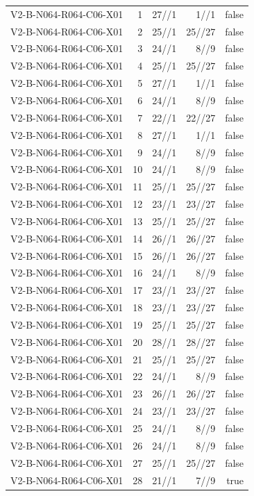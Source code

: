 {\begin{longtable}{lrrrr}
V2-B-N064-R064-C06-X01 & 1 & 27//1 & 1//1 & false \\
V2-B-N064-R064-C06-X01 & 2 & 25//1 & 25//27 & false \\
V2-B-N064-R064-C06-X01 & 3 & 24//1 & 8//9 & false \\
V2-B-N064-R064-C06-X01 & 4 & 25//1 & 25//27 & false \\
V2-B-N064-R064-C06-X01 & 5 & 27//1 & 1//1 & false \\
V2-B-N064-R064-C06-X01 & 6 & 24//1 & 8//9 & false \\
V2-B-N064-R064-C06-X01 & 7 & 22//1 & 22//27 & false \\
V2-B-N064-R064-C06-X01 & 8 & 27//1 & 1//1 & false \\
V2-B-N064-R064-C06-X01 & 9 & 24//1 & 8//9 & false \\
V2-B-N064-R064-C06-X01 & 10 & 24//1 & 8//9 & false \\
V2-B-N064-R064-C06-X01 & 11 & 25//1 & 25//27 & false \\
V2-B-N064-R064-C06-X01 & 12 & 23//1 & 23//27 & false \\
V2-B-N064-R064-C06-X01 & 13 & 25//1 & 25//27 & false \\
V2-B-N064-R064-C06-X01 & 14 & 26//1 & 26//27 & false \\
V2-B-N064-R064-C06-X01 & 15 & 26//1 & 26//27 & false \\
V2-B-N064-R064-C06-X01 & 16 & 24//1 & 8//9 & false \\
V2-B-N064-R064-C06-X01 & 17 & 23//1 & 23//27 & false \\
V2-B-N064-R064-C06-X01 & 18 & 23//1 & 23//27 & false \\
V2-B-N064-R064-C06-X01 & 19 & 25//1 & 25//27 & false \\
V2-B-N064-R064-C06-X01 & 20 & 28//1 & 28//27 & false \\
V2-B-N064-R064-C06-X01 & 21 & 25//1 & 25//27 & false \\
V2-B-N064-R064-C06-X01 & 22 & 24//1 & 8//9 & false \\
V2-B-N064-R064-C06-X01 & 23 & 26//1 & 26//27 & false \\
V2-B-N064-R064-C06-X01 & 24 & 23//1 & 23//27 & false \\
V2-B-N064-R064-C06-X01 & 25 & 24//1 & 8//9 & false \\
V2-B-N064-R064-C06-X01 & 26 & 24//1 & 8//9 & false \\
V2-B-N064-R064-C06-X01 & 27 & 25//1 & 25//27 & false \\
V2-B-N064-R064-C06-X01 & 28 & 21//1 & 7//9 & true \\

\end{longtable}}
